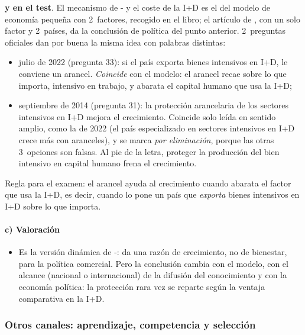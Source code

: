 \documentclass[11pt]{article}
\begin{document}
\begin{notaopositor}
\textbf{ y  en el test}. El mecanismo de - y el coste de la I+D es el del modelo de economía pequeña con 2~factores\nocite{GrossmanHelpman1991Small}, recogido en el libro\nocite{GrossmanHelpman1991}; el artículo de \textcite{GrossmanHelpman1990Comparative}, con un solo factor y 2~países, da la conclusión de política del punto anterior. 2~preguntas oficiales dan por buena la misma idea con palabras distintas:
\begin{itemize}
\item julio de 2022 (pregunta 33): si el país exporta bienes intensivos en I+D, le conviene un arancel. \emph{Coincide} con el modelo: el arancel recae sobre lo que importa, intensivo en trabajo, y abarata el capital humano que usa la I+D;
\item septiembre de 2014 (pregunta 31): la protección arancelaria de los sectores intensivos en I+D mejora el crecimiento. Coincide solo leída en sentido amplio, como la de 2022 (el país especializado en sectores intensivos en I+D crece más con aranceles), y se marca \emph{por eliminación}, porque las otras 3~opciones son falsas. Al pie de la letra, proteger la producción del bien intensivo en capital humano frena el crecimiento.
\end{itemize}
Regla para el examen: el arancel ayuda al crecimiento cuando abarata el factor que usa la I+D, es decir, cuando lo pone un país que \emph{exporta} bienes intensivos en I+D sobre lo que importa.
\end{notaopositor}

\paragraph{c) Valoración}

\begin{itemize}
\item Es la versión dinámica de -: da una razón de crecimiento, no de bienestar, para la política comercial. Pero la conclusión cambia con el modelo, con el alcance (nacional o internacional) de la difusión del conocimiento y con la economía política: la protección rara vez se reparte según la ventaja comparativa en la I+D.
\end{itemize}

\subsubsection{Otros canales: aprendizaje, competencia y selección}\label{sec:otros-canales}
\end{document}

